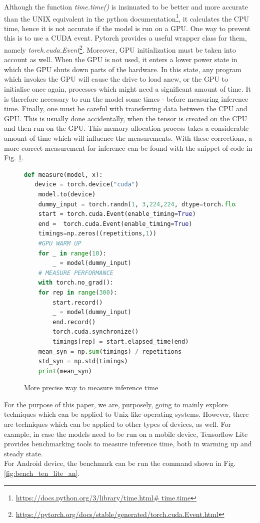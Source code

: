Although the function \textit{time.time()} is insinuated to be better and more accurate than the UNIX equivalent in the python documentation\footnote{ \url{https://docs.python.org/3/library/time.html\# time.time} }, it calculates the CPU time, hence it is not accurate if the model is run on a GPU. One way to prevent this is to use a CUDA event. Pytorch provides a useful wrapper class for them, namely \textit{torch.cuda.Event}\footnote{ \url{https://pytorch.org/docs/stable/generated/torch.cuda.Event.html} }. Moreover, GPU initialization must be taken into account as well. When the GPU is not used, it enters a lower power state in which the GPU shuts down parts of the hardware. In this state, any program which invokes the GPU will cause the drive to load anew, or the GPU to initialise once again, processes which might need a significant amount of time. It is therefore necessary to run the model some times - before measuring inference time. \cite{Correct_inference_measure}
Finally, one must be careful with transferring data between the CPU and GPU. This is usually done accidentally, when the tensor is created on the CPU and then run on the GPU. This memory allocation process takes a considerable amount of time which will influence the measurements. \cite{Correct_inference_measure}
With these corrections, a more correct measurement for inference can be found with the snippet of code in Fig. \ref{fig:corr_inf}.\\
\begin{figure}[h]
\begin{lstlisting}[language=python]
def measure(model, x):
   device = torch.device("cuda")
    model.to(device)
    dummy_input = torch.randn(1, 3,224,224, dtype=torch.float).to(device)
    start = torch.cuda.Event(enable_timing=True)
    end =  torch.cuda.Event(enable_timing=True)
    timings=np.zeros((repetitions,1))
    #GPU WARM UP
    for _ in range(10):
        _ = model(dummy_input)
    # MEASURE PERFORMANCE
    with torch.no_grad():
    for rep in range(300):
        start.record()
        _ = model(dummy_input)
        end.record()
        torch.cuda.synchronize()
        timings[rep] = start.elapsed_time(end)
    mean_syn = np.sum(timings) / repetitions
    std_syn = np.std(timings)
    print(mean_syn)

\end{lstlisting}
\caption{More precise way to measure inference time}
\label{fig:corr_inf}
\end{figure}

For the purpose of this paper, we are, purposely, going to mainly explore techniques which can be applied to Unix-like operating systems. However, there are techniques which can be applied to other types of devices, as well. For example, in case the models need to be run on a mobile device, Tensorflow Lite provides benchmarking tools to measure inference time, both in warming up and steady state. \cite{tensorflow2015-whitepaper}\\ 
For Android device, the benchmark can be run the command shown in Fig. \ref{fig:bench_ten_lite_an}.\\



